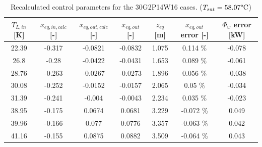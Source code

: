 \begin{table}[!h]
\centering
\begin{tabular}{c|c|c|c|c|c|c}
$T_{L,in}$ {[}K{]} & $x_{eq,in,calc}$ {[}-{]} & $x_{eq,out,calc}$ {[}-{]} & $x_{eq,out}$ {[}-{]} & $z_{eq}$ {[}m{]} & $x_{eq,out}$ error {[}-{]} & $\Phi_{w}$ error {[}kW{]} \\
\hline
\hline
22.39  &  -0.317  &  -0.0821  &  -0.0832  &  1.075  &  0.114 \% &  -0.078 \\
%
26.8  &  -0.28  &  -0.0422  &  -0.0431  &  1.653  &  0.089 \% &  -0.061\\
%
28.76  &  -0.263  &  -0.0267  &  -0.0273  &  1.896  &  0.056 \% &  -0.038\\
%
30.08  &  -0.252  &  -0.0152  &  -0.0157  &  2.065  &  0.05 \% &  -0.034\\
%
31.39  &  -0.241  &  -0.004  &  -0.0043  &  2.234  &  0.035 \% &  -0.023\\
%
38.95  &  -0.175  &  0.0674  &  0.0681  &  3.229  &  -0.072 \% &  0.049\\
%
39.96  &  -0.166  &  0.077  &  0.0776  &  3.357  &  -0.063 \% &  0.042\\
%
41.16  &  -0.155  &  0.0875  &  0.0882  &  3.509  &  -0.064 \% &  0.043
\end{tabular}
\caption{Recalculated control parameters for the 30G2P14W16 cases. ($T_{sat} = 58.07\degree\mathrm{C}$)}
\label{tab:30P14_recalc}
\end{table}


